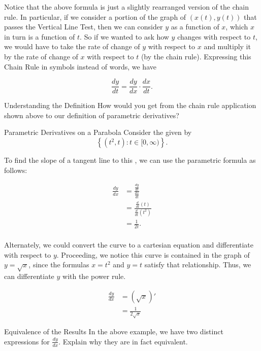 Notice that the above formula is just a slightly rearranged version of the chain rule.  In particular, if we consider a portion of the graph of $\left(x(t),y(t)\right)$ that passes the Vertical Line Test, then we can consider $y$ as a function of $x$, which $x$ in turn is a function of $t$.  So if we wanted to ask how $y$ changes with respect to $t$, we would have to take the rate of change of $y$ with respect to $x$ and multiply it by the rate of change of $x$ with respect to $t$ (by the chain rule).  Expressing this Chain Rule in symbols instead of words, we have

$$\frac{ dy}{dt }=\frac{dy}{dx }\cdot \frac{dx}{dt }. $$

\begin{exercise}{Understanding the Definition \Coffeecup}
How would you get from the chain rule application shown above to our definition of parametric derivatives?
\vspace*{.5in}
\end{exercise}

\begin{example}{Parametric Derivatives on a Parabola}
Consider the  given by  $$\left\{\left(t^2,t\right): t\in [0,\infty) \right\}.$$ 

To find the slope of a tangent line to this , we can use the parametric  formula as follows:

\begin{align*}
\frac{dy}{dx}&=\frac{\frac{dy}{dt}}{\frac{dx}{dt}} \\
 &=\frac{\frac{d}{dt}\left( t\right)}{\frac{d}{dt}\left( t^2\right)} \\
 &=\frac{1}{2t}.\\
\end{align*}

Alternately, we could convert the curve to a cartesian equation and differentiate with respect to $y$.  Proceeding, we notice this curve is contained in the graph of $y=\sqrt{x}$, since the formulas $x=t^2$ and $y=t$ satisfy that relationship.  Thus, we can differentiate $y$ with the power rule.

\begin{align*}
\frac{dy}{dx}&=\left( \sqrt{x}\right)' \\
&=\frac{1}{2\sqrt{x}}
\end{align*}
\end{example}

\begin{exercise}{Equivalence of the Results \Coffeecup \Coffeecup}
In the above example, we have two distinct expressions for $\frac{dy}{dx}$.  Explain why they are in fact equivalent. \vspace*{1in} 
\end{exercise}

